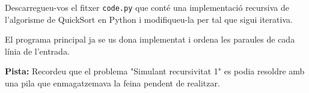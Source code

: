 

\Statement

Descarregueu-vos el fitxer \texttt{code.py} que conté una implementació recursiva de l'algorisme de QuickSort en Python
i modifiqueu-la per tal que sigui iterativa.

\bigskip

El programa principal ja se us dona implementat i ordena les paraules de cada línia de l'entrada.

\bigskip


\textbf{Pista: }
Recordeu que el problema "Simulant recursivitat 1" es podia resoldre amb una pila que enmagatzemava la feina pendent de realitzar.


\Sample
